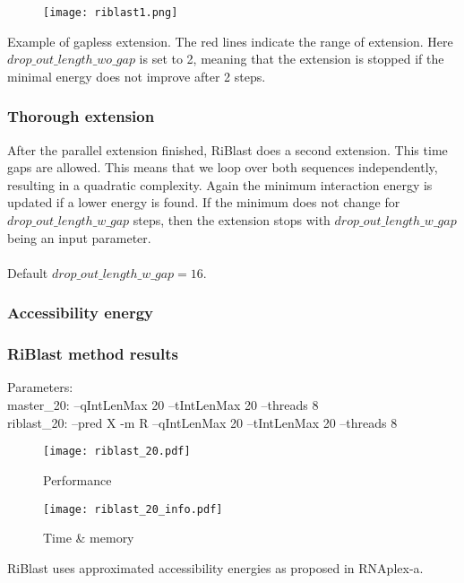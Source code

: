 \begin{figure}[H]
	\centering
	\texttt{[image: riblast1.png]}
\end{figure}

Example of gapless extension. The red lines indicate the range of extension. Here $drop\_out\_length\_wo\_gap$ is set to 2, meaning that the extension is stopped if the minimal energy does not improve after 2 steps.

\subsubsection{Thorough extension}

After the parallel extension finished, RiBlast does a second extension. This time gaps are allowed. This means that we loop over both sequences independently, resulting in a quadratic complexity. Again the minimum interaction energy is updated if a lower energy is found. If the minimum does not change for $drop\_out\_length\_w\_gap$ steps, then the extension stops with $drop\_out\_length\_w\_gap$ being an input parameter.
\\\\
Default $drop\_out\_length\_w\_gap = 16$.

\subsubsection{Accessibility energy}

\clearpage

\subsubsection{RiBlast method results}

Parameters:\\
master\_20: --qIntLenMax 20 --tIntLenMax 20 --threads 8\\
riblast\_20: --pred X -m R --qIntLenMax 20 --tIntLenMax 20 --threads 8\\

\begin{figure}[H]
	\centering
	\caption{Performance}
	\texttt{[image: riblast\_20.pdf]}
\end{figure}

\begin{figure}[H]
	\centering
	\caption{Time \& memory}
	\texttt{[image: riblast\_20\_info.pdf]}
\end{figure}

RiBlast uses approximated accessibility energies as proposed in RNAplex-a.